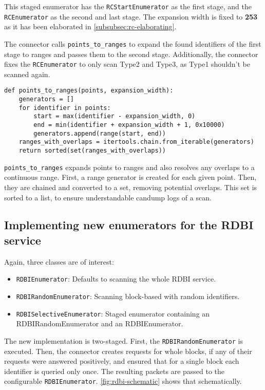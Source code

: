This staged enumerator has the \texttt{RCStartEnumerator} as the first stage, and the \texttt{RCEnumerator} as the second and last stage.
The expansion width is fixed to \textbf{253} as it has been elaborated in \autoref{subsubsec:rc-elaborating}.

The connector calls \texttt{points_to_ranges} to expand the found identifiers of the first stage to ranges and passes them to the second stage. Additionally, the connector fixes the \texttt{RCEnumerator} to only scan Type2 and Type3, as Type1 shouldn't be scanned again.

\begin{samepage}
\begin{verbatim}
def points_to_ranges(points, expansion_width):
    generators = []
    for identifier in points:
        start = max(identifier - expansion_width, 0)
        end = min(identifier + expansion_width + 1, 0x10000)
        generators.append(range(start, end))
    ranges_with_overlaps = itertools.chain.from_iterable(generators)
    return sorted(set(ranges_with_overlaps))
\end{verbatim}
\end{samepage}

\texttt{points_to_ranges} expands points to ranges and also resolves any overlaps to a continuous range.
First, a range generator is created for each given point. Then, they are chained and converted to a set, removing potential overlaps. This set is sorted to a list, to ensure understandable candump logs of a scan.

\subsection{Implementing new enumerators for the RDBI service}

Again, three classes are of interest:

\begin{itemize}
    \item \texttt{RDBIEnumerator}: Defaults to scanning the whole RDBI service.
    \item \texttt{RDBIRandomEnumerator}: Scanning block-based with random identifiers.
    \item \texttt{RDBISelectiveEnumerator}: Staged enumerator containing an RDBIRandomEnumerator and an RDBIEnumerator.
\end{itemize}

The new implementation is two-staged. First, the \texttt{RDBIRandomEnumerator} is executed. Then, the connector creates requests for whole blocks, if any of their requests were answered positively, and ensured that for a single block each identifier is queried only once. The resulting packets are passed to the configurable \texttt{RDBIEnumerator}. \autoref{fig:rdbi-schematic} shows that schematically.

